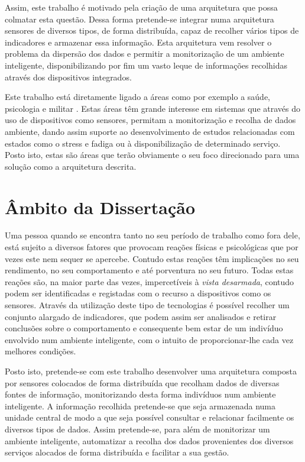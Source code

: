 Assim, este trabalho é motivado pela criação de uma arquitetura que possa colmatar esta questão. Dessa forma pretende-se integrar numa arquitetura sensores de diversos tipos, de forma distribuída, capaz de recolher vários tipos de indicadores e armazenar essa informação. Esta arquitetura vem resolver o problema da dispersão dos dados e permitir a monitorização de um ambiente inteligente, disponibilizando por fim um vasto leque de informações recolhidas através dos dispositivos integrados.

Este trabalho está diretamente ligado a áreas como por exemplo a saúde, psicologia e militar \cite{akyildiz2002wireless, aarts2006into}. Estas áreas têm grande interesse em sistemas que através do uso de dispositivos como sensores, permitam a monitorização e recolha de dados ambiente, dando assim suporte ao desenvolvimento de estudos relacionadas com estados como o stress e fadiga ou à disponibilização de determinado serviço. Posto isto, estas são áreas que terão obviamente o seu foco direcionado para uma solução como a arquitetura descrita.


\section{Âmbito da Dissertação}
Uma pessoa quando se encontra tanto no seu período de trabalho como fora dele, está sujeito a diversos fatores que provocam reações físicas e psicológicas que por vezes este nem sequer se apercebe. Contudo estas reações têm implicações no seu rendimento, no seu comportamento e até porventura no seu futuro. Todas estas reações são, na maior parte das vezes, impercetíveis à \textit{vista desarmada}, contudo podem ser identificadas e registadas com o recurso a dispositivos como os sensores. Através da utilização deste tipo de tecnologias é possível recolher um conjunto alargado de indicadores, que podem assim ser analisados e retirar conclusões sobre o comportamento e consequente bem estar de um indivíduo envolvido num ambiente inteligente, com o intuito de proporcionar-lhe cada vez melhores condições.

Posto isto, pretende-se com este trabalho desenvolver uma arquitetura composta por sensores colocados de forma distribuída que recolham dados de diversas fontes de informação, monitorizando desta forma indivíduos num ambiente inteligente. A informação recolhida pretende-se que seja armazenada numa unidade central de modo a que seja possível consultar e relacionar facilmente os diversos tipos de dados. Assim pretende-se, para além de monitorizar um ambiente inteligente, automatizar a recolha dos dados provenientes dos diversos serviços alocados de forma distribuída e facilitar a sua gestão.


